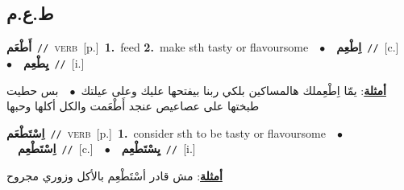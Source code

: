 \documentclass[10pt,a4paper,twoside]{article} %
\begin{document}
\begin{multicols}{2}
\vspace{-3mm}
\subsection*{\color{blue}\foreignlanguage{arabic}{ط.ع.م}\color{blue}{}} 

{\setlength\topsep{0pt}\textbf{\foreignlanguage{arabic}{أَطْعَم}}\ {\color{gray}\texttt{//}\color{black}}\ \textsc{verb}\ [p.]\ \textbf{1.}~feed  \textbf{2.}~make sth tasty or flavoursome\ \ $\bullet$\ \ \setlength\topsep{0pt}\textbf{\foreignlanguage{arabic}{اِطْعِم}}\ {\color{gray}\texttt{//}\color{black}}\ [c.]\ \ $\bullet$\ \ \setlength\topsep{0pt}\textbf{\foreignlanguage{arabic}{يِطْعِم}}\ {\color{gray}\texttt{//}\color{black}}\ [i.]\  \begin{flushright}\color{gray}\foreignlanguage{arabic}{\textbf{\underline{\foreignlanguage{arabic}{أمثلة}}}: يمّا اِطْعِملك هالمساكين بلكي ربنا بيفتحها عليك وعلى عيلتك\ $\bullet$\ \  بس حطيت طبختها على عصاعيص عنجد أَطْعَمت والكل أكلها وحبها}\end{flushright}\color{black}} \vspace{2mm}

{\setlength\topsep{0pt}\textbf{\foreignlanguage{arabic}{اِسْتَطْعَم}}\ {\color{gray}\texttt{//}\color{black}}\ \textsc{verb}\ [p.]\ \textbf{1.}~consider sth to be tasty or flavoursome\ \ $\bullet$\ \ \setlength\topsep{0pt}\textbf{\foreignlanguage{arabic}{اِسْتَطْعِم}}\ {\color{gray}\texttt{//}\color{black}}\ [c.]\ \ $\bullet$\ \ \setlength\topsep{0pt}\textbf{\foreignlanguage{arabic}{يِسْتَطْعِم}}\ {\color{gray}\texttt{//}\color{black}}\ [i.]\  \begin{flushright}\color{gray}\foreignlanguage{arabic}{\textbf{\underline{\foreignlanguage{arabic}{أمثلة}}}: مش قادر أسْتَطْعِم بالأكل وزوري مجروح}\end{flushright}\color{black}} \vspace{2mm}


\end{multicols}
\end{document}
